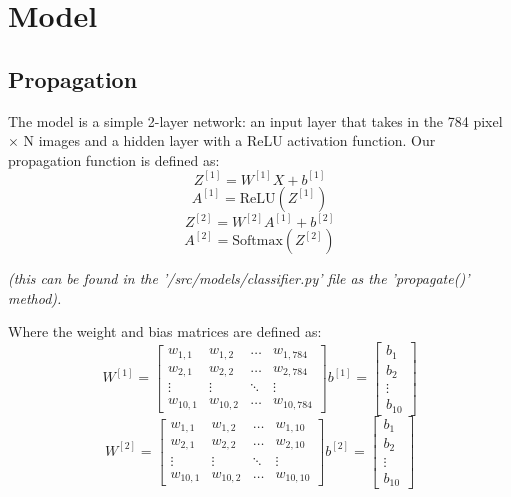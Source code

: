 \documentclass[11pt]{article}
\theoremstyle{definition}
\begin{document}
\section{Model}

\subsection{Propagation}
The model is a simple 2-layer network: an input layer that takes in the 784 pixel $\times $ N images and a hidden layer with a ReLU activation function. Our propagation function
is defined as:\\
\begin{equation}
    Z^{[1]} = W^{[1]}X + b^{[1]}
\end{equation}
\begin{equation}
    A^{[1]} = \text{ReLU}(Z^{[1]})
\end{equation}
\begin{equation}
    Z^{[2]} = W^{[2]}A^{[1]} + b^{[2]}
\end{equation}
\begin{equation}
    A^{[2]} = \text{Softmax}(Z^{[2]})
\end{equation}
\begin{center}
    \emph{(this can be found in the '/src/models/classifier.py' file as the 
        'propagate()' method).}
\end{center}
Where the weight and bias matrices are defined as:
\begin{equation}
    W^{[1]} = \begin{bmatrix}
        w_{1,1} & w_{1,2} & \dots & w_{1, 784} \\
        w_{2,1} & w_{2,2} & \dots & w_{2, 784} \\
        \vdots & \vdots & \ddots & \vdots \\
        w_{10, 1} & w_{10, 2} & \dots & w_{10, 784}
    \end{bmatrix}
    b^{[1]} = \begin{bmatrix}
        b_{1} \\
        b_{2} \\
        \vdots \\
        b_{10}
    \end{bmatrix}
\end{equation}
\begin{equation}
    W^{[2]} = \begin{bmatrix}
        w_{1,1} & w_{1,2} & \dots & w_{1, 10} \\
        w_{2,1} & w_{2,2} & \dots & w_{2, 10} \\
        \vdots & \vdots & \ddots & \vdots \\
        w_{10, 1} & w_{10, 2} & \dots & w_{10, 10}
    \end{bmatrix}
    b^{[2]} = \begin{bmatrix}
        b_{1} \\
        b_{2} \\
        \vdots \\
        b_{10}
    \end{bmatrix}
\end{equation}
\end{document}
